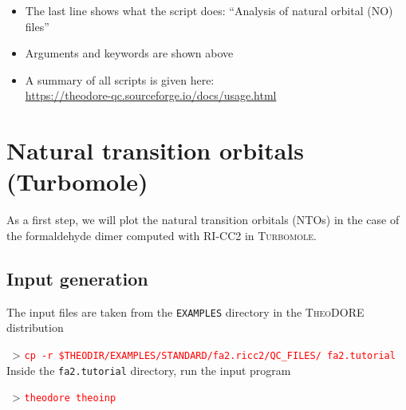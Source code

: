 \documentclass[DIV=12,headings=normal]{scrartcl}
\newcommand{\redl}[1]{{\textcolor{red}{\texttt{#1}}}}
\newcommand{\comm}[1]{
\small
~> \redl{#1}
\normalsize
}
\newcommand{\theo}{\textsc{TheoDORE}}
\begin{document}
\begin{itemize}
\item The last line shows what the script does: ``Analysis of natural orbital (NO) files''
\item Arguments and keywords are shown above
\item A summary of all scripts is given here:\\
\url{https://theodore-qc.sourceforge.io/docs/usage.html}
\end{itemize}

\clearpage
\section{Natural transition orbitals (Turbomole)}

As a first step, we will plot the natural transition orbitals (NTOs) in the case of the formaldehyde dimer computed with RI-CC2 in \textsc{Turbomole}.

\subsection{Input generation}
\label{sec:inpnto}

The input files are taken from the \texttt{EXAMPLES} directory in the \theo{} distribution

\comm{cp -r \$THEODIR/EXAMPLES/STANDARD/fa2.ricc2/QC\_FILES/ fa2.tutorial} \\

Inside the \texttt{fa2.tutorial} directory, run the input program

\comm{theodore theoinp}
\end{document}
